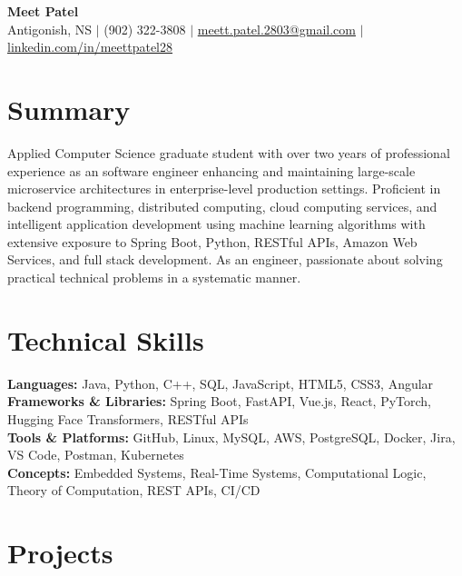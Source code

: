 \documentclass[10pt, letterpaper]{article}
\begin{document}
\begin{center}
  {\LARGE \textbf{Meet Patel}} \\[0pt]
  \small
  Antigonish, NS $\vert$
  (902) 322-3808 $\vert$
  \href{mailto:meett.patel.2803@gmail.com}{meett.patel.2803@gmail.com} $\vert$
  \href{https://linkedin.com/in/meettpatel28}{linkedin.com/in/meettpatel28}
\end{center}
\vspace{-7pt}


\section{Summary}
\small

Applied Computer Science graduate student with over two years of professional experience as an software engineer enhancing and maintaining large-scale microservice architectures in enterprise-level production settings. Proficient in backend programming, distributed computing, cloud computing services, and intelligent application development using machine learning algorithms with extensive exposure to Spring Boot, Python, RESTful APIs, Amazon Web Services, and full stack development. As an engineer, passionate about solving practical technical problems in a systematic manner.

\vspace{1pt}

\section{Technical Skills}
\small
\textbf{Languages:} Java, Python, C++, SQL, JavaScript, HTML5, CSS3, Angular \\
\textbf{Frameworks \& Libraries:} Spring Boot, FastAPI, Vue.js, React, PyTorch, Hugging Face Transformers, RESTful APIs \\
\textbf{Tools \& Platforms:} GitHub, Linux, MySQL, AWS, PostgreSQL, Docker, Jira, VS Code, Postman, Kubernetes \\
\textbf{Concepts:} Embedded Systems, Real-Time Systems, Computational Logic, Theory of Computation, REST APIs, CI/CD

\vspace{1pt}

\section{Projects}
\end{document}
